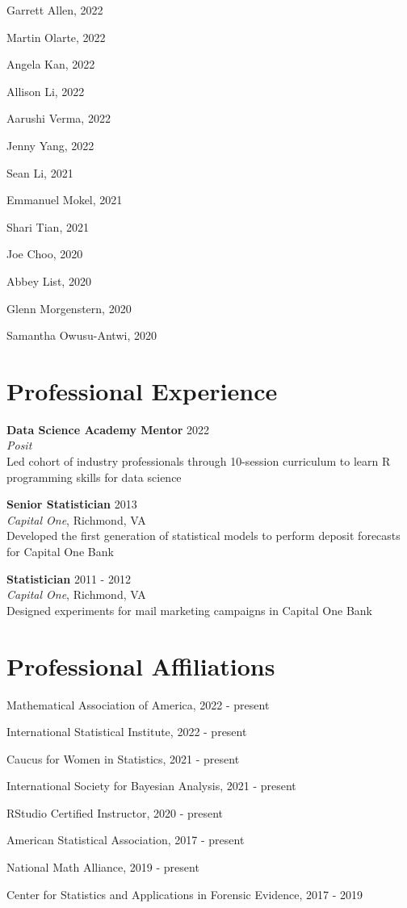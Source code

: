 \documentclass[11pt,dvipsnames]{article}
\renewenvironment{itemize}{
  \begin{list}{}{
    \setlength{\leftmargin}{1.5em}
  }
}{
  \end{list}
}
\begin{document}
\begin{multicols}{2}
\begin{itemize}
\item Garrett Allen, 2022
\item Martin Olarte, 2022
\item Angela Kan, 2022
\item Allison Li, 2022
\item Aarushi Verma, 2022
\item Jenny Yang, 2022
\item Sean Li, 2021
\item Emmanuel Mokel, 2021
\item Shari Tian, 2021
\item Joe Choo, 2020
\item Abbey List, 2020
\item Glenn Morgenstern, 2020
\item Samantha Owusu-Antwi, 2020
\end{itemize}
\end{multicols}

\section{Professional Experience}\label{professional-experience}

\textbf{Data Science Academy Mentor} \hfill 2022\\
\emph{Posit}\\
Led cohort of industry professionals through 10-session curriculum to
learn R programming skills for data science \vspace{8pt}

\textbf{Senior Statistician} \hfill 2013\\
\emph{Capital One}, Richmond, VA\\
Developed the first generation of statistical models to perform deposit
forecasts for Capital One Bank \vspace{8pt}

\textbf{Statistician} \hfill 2011 - 2012\\
\emph{Capital One}, Richmond, VA\\
Designed experiments for mail marketing campaigns in Capital One Bank

\section{Professional Affiliations}\label{professional-affiliations}

Mathematical Association of America, 2022 - present

International Statistical Institute, 2022 - present

Caucus for Women in Statistics, 2021 - present

International Society for Bayesian Analysis, 2021 - present

RStudio Certified Instructor, 2020 - present

American Statistical Association, 2017 - present

National Math Alliance, 2019 - present

Center for Statistics and Applications in Forensic Evidence, 2017 - 2019
\end{document}
